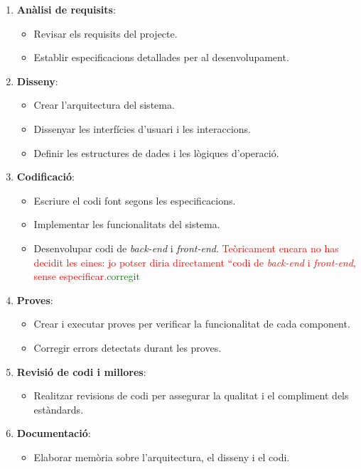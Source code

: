 \documentclass[a4paper,12pt,twoside]{ThesisStyle}
\newcommand{\pau}[1]{\textcolor{red}{#1}}
\newcommand{\sudan}[1]{\textcolor{green}{#1}}
\begin{document}
\begin{enumerate}
  \item \textbf{Anàlisi de requisits}:
  \begin{itemize}
      \item Revisar els requisits del projecte.
      \item Establir especificacions detallades per al desenvolupament.
  \end{itemize}

  \item \textbf{Disseny}:
  \begin{itemize}
      \item Crear l'arquitectura del sistema.
      \item Dissenyar les interfícies d'usuari i les interaccions.
      \item Definir les estructures de dades i les lògiques d'operació.
  \end{itemize}

  \item \textbf{Codificació}:
  \begin{itemize}
      \item Escriure el codi font segons les especificacions.
      \item Implementar les funcionalitats del sistema.
      \item Desenvolupar codi de \textit{back-end} i \textit{front-end}. 
      \pau{Teòricament encara no has decidit les eines: jo potser diria directament ``codi de \textit{back-end} i \textit{front-end}, sense especificar.}\sudan{corregit}
  \end{itemize}

  \item \textbf{Proves}:
  \begin{itemize}
      \item Crear i executar proves per verificar la funcionalitat de cada component.
      \item Corregir errors detectats durant les proves.
  \end{itemize}

  \item \textbf{Revisió de codi i millores}:
  \begin{itemize}
      \item Realitzar revisions de codi per assegurar la qualitat i el compliment dels estàndards.
  \end{itemize}

  \item \textbf{Documentació}:
  \begin{itemize}
      \item Elaborar memòria sobre l'arquitectura, el disseny i el codi.
  \end{itemize}


\end{enumerate}
\end{document}
